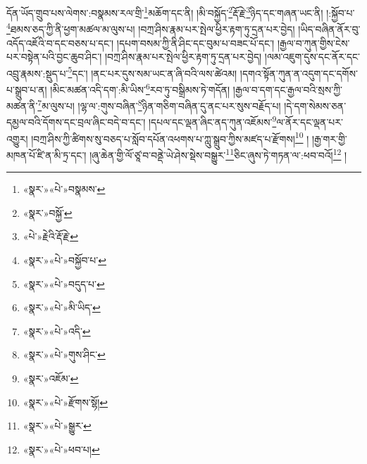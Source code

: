 དོན་ཡོད་གྲུབ་པས་ལེགས་:བསྣམས་རལ་གྲི་\footnote{«སྣར་»«པེ་»བསྣམས་}མཆོག་དང་ནི། །མི་བསྐྱོད་\footnote{«སྣར་»བསྐྱོ་}རྡོ་རྗེ་\footnote{«པེ་»རྗེའི་རྡོ་རྗེ་}ཉིད་དང་གཞན་ཡང་ནི། །:སྐྱོབ་པ་\footnote{«སྣར་»«པེ་»བསྐྱོབ་པ་}ཐམས་ཅད་ཀྱི་ནི་ཕྱག་མཚལ་མ་ལུས་པ། །བཀྲ་ཤིས་རྣམ་པར་སྤེལ་ཕྱིར་རྟག་ཏུ་དྲན་པར་བྱེད། །ཡིད་བཞིན་ནོར་བུ་འདོད་འཇོའི་བ་དང་བཅས་པ་དང་། །དཔག་བསམ་ཀྱི་ནི་ཤིང་དང་བུམ་པ་བཟང་པོ་དང་། །རྒྱལ་བ་ཀུན་གྱིས་ངེས་པར་བསྟེན་པའི་བྱང་ཆུབ་ཤིང་། །བཀྲ་ཤིས་རྣམ་པར་སྤེལ་ཕྱིར་རྟག་ཏུ་དྲན་པར་བྱེད། །ལམ་འཇུག་དུས་དང་ནོར་དང་འབྲུ་རྣམས་:སྡུད་པ་\footnote{«སྣར་»«པེ་»བདུད་པ་}དང་། །ནང་པར་དུས་སམ་ཡང་ན་ཞི་བའི་ལས་ཚེའམ། །དགའ་སྟོན་ཀུན་ན་འདུག་དང་དགོས་པ་སྒྲུབ་པ་ན། །མིང་མཚན་འདི་དག་:མི་ཡིས་\footnote{«སྣར་»«པེ་»མི་ཡིད་}རབ་ཏུ་བསྒྲིམས་ཏེ་གདོན། །རྒྱལ་བ་དག་དང་རྒྱལ་བའི་སྲས་ཀྱི་མཚན་ནི་\footnote{«སྣར་»«པེ་»འདི་}མ་ལུས་པ། །ལྷ་ལ་:གུས་བཞིན་\footnote{«སྣར་»«པེ་»གུས་ཤིང་}ཉིན་གཅིག་བཞིན་དུ་ནང་པར་སུས་བརྗོད་པ། །དེ་དག་སེམས་ཅན་དམྱལ་བའི་དོགས་དང་བྲལ་ཞིང་བདེ་བ་དང་། །དཔལ་དང་ལྡན་ཞིང་ནད་ཀུན་འཇོམས་\footnote{«སྣར་»འཇོམ་}ལ་ནོར་དང་ལྡན་པར་འགྱུར། །བཀྲ་ཤིས་ཀྱི་ཚིགས་སུ་བཅད་པ་སློབ་དཔོན་འཕགས་པ་ཀླུ་སྒྲུབ་ཀྱིས་མཛད་པ་རྫོགས།\footnote{«སྣར་»«པེ་»རྫོགས་སྷོ།} ། །རྒྱ་གར་གྱི་མཁན་པོ་ཛི་ན་མི་ཏྲ་དང་། །ཞུ་ཆེན་གྱི་ལོ་ཙཱ་བ་བནྡེ་ཡེ་ཤེས་སྡེས་བསྒྱུར་\footnote{«སྣར་»«པེ་»སྒྱུར་}ཅིང་ཞུས་ཏེ་གཏན་ལ་:ཕབ་བའོ།\footnote{«སྣར་»«པེ་»ཕབ་པ།} །
